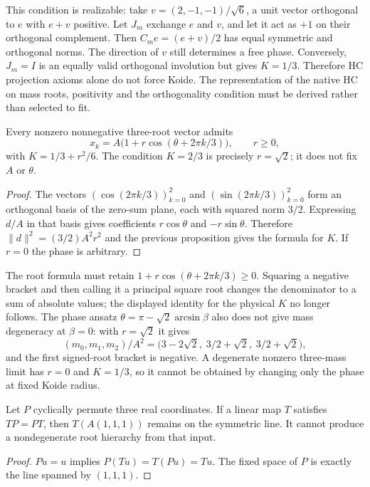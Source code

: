 This condition is realizable: take $v=(2,-1,-1)/\sqrt6$, a unit
vector orthogonal to $e$ with $e+v$ positive. Let $J_m$ exchange $e$ and $v$, and let it
act as $+1$ on their orthogonal complement. Then
$C_m e=(e+v)/2$ has equal symmetric and orthogonal norms.
The direction of $v$ still determines a free phase. Conversely,
$J_m=I$ is an equally valid orthogonal involution but gives $K=1/3$.
Therefore HC projection axioms alone do not force Koide. The
representation of the native HC on mass roots, positivity and the
orthogonality condition must be derived rather than selected to fit.

\begin{proposition}
\label{v480:koide-radius-phase}
Every nonzero nonnegative three-root vector admits
\[
 x_k=A\bigl(1+r\cos(\theta+2\pi k/3)\bigr),\qquad r\geq0,
\]
with $K=1/3+r^2/6$. The condition $K=2/3$ is precisely $r=\sqrt2$;
it does not fix $A$ or $\theta$.
\end{proposition}
\begin{proof}
The vectors $(\cos(2\pi k/3))_{k=0}^2$ and
$(\sin(2\pi k/3))_{k=0}^2$ form an orthogonal basis of the
zero-sum plane, each with squared norm $3/2$. Expressing $d/A$
in that basis gives coefficients $r\cos\theta$ and
$-r\sin\theta$. Therefore $\|d\|^2=(3/2)A^2r^2$ and the
previous proposition gives the formula for $K$. If $r=0$ the
phase is arbitrary.
\end{proof}

The root formula must retain $1+r\cos(\theta+2\pi k/3)\geq0$.
Squaring a negative bracket and then calling it a principal square
root changes the denominator to a sum of absolute values; the
displayed identity for the physical $K$ no longer follows.
The phase ansatz $\theta=\pi-\sqrt2\arcsin\beta$ also does not
give mass degeneracy at $\beta=0$: with $r=\sqrt2$ it gives
\[
 (m_0,m_1,m_2)/A^2
 =\bigl(3-2\sqrt2,\;3/2+\sqrt2,\;3/2+\sqrt2\bigr),
\]
and the first signed-root bracket is negative. A degenerate
nonzero three-mass limit has $r=0$ and $K=1/3$, so it cannot
be obtained by changing only the phase at fixed Koide radius.

\begin{proposition}
\label{v480:koide-equivariant-obstruction}
Let $P$ cyclically permute three real coordinates. If a linear map
$T$ satisfies $TP=PT$, then $T(A(1,1,1))$ remains on the symmetric
line. It cannot produce a nondegenerate root hierarchy from that input.
\end{proposition}
\begin{proof}
$Pu=u$ implies $P(Tu)=T(Pu)=Tu$. The fixed space of $P$ is
exactly the line spanned by $(1,1,1)$.
\end{proof}

